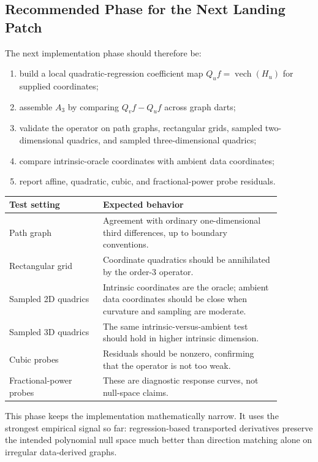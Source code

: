 \documentclass[11pt]{article}
\begin{document}
\subsection{Recommended Phase for the Next Landing Patch}

The next implementation phase should therefore be:
\begin{enumerate}[label=(\roman*),leftmargin=*]
  \item build a local quadratic-regression coefficient map
  \(Q_u f=\operatorname{vech}(H_u)\) for supplied coordinates;
  \item assemble \(A_3\) by comparing \(Q_v f-Q_u f\) across graph darts;
  \item validate the operator on path graphs, rectangular grids, sampled
  two-dimensional quadrics, and sampled three-dimensional quadrics;
  \item compare intrinsic-oracle coordinates with ambient data coordinates;
  \item report affine, quadratic, cubic, and fractional-power probe residuals.
\end{enumerate}

\begin{center}
\begin{tabular}{p{0.30\linewidth}p{0.58\linewidth}}
\toprule
Test setting & Expected behavior \\
\midrule
Path graph & Agreement with ordinary one-dimensional third differences,
up to boundary conventions. \\
Rectangular grid & Coordinate quadratics should be annihilated by the
order-3 operator. \\
Sampled 2D quadrics & Intrinsic coordinates are the oracle; ambient data
coordinates should be close when curvature and sampling are moderate. \\
Sampled 3D quadrics & The same intrinsic-versus-ambient test should hold in
higher intrinsic dimension. \\
Cubic probes & Residuals should be nonzero, confirming that the operator is
not too weak. \\
Fractional-power probes & These are diagnostic response curves, not
null-space claims. \\
\bottomrule
\end{tabular}
\end{center}

This phase keeps the implementation mathematically narrow.  It uses the
strongest empirical signal so far: regression-based transported derivatives
preserve the intended polynomial null space much better than direction
matching alone on irregular data-derived graphs.
\end{document}

